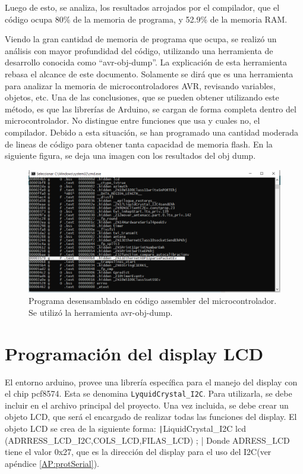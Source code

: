 Luego de esto, se analiza, los resultados arrojados por el compilador, que el código ocupa 80\% de la memoria de programa, y 52.9\% de la memoria RAM. 

Viendo la gran cantidad de memoria de programa que ocupa, se realizó un análisis con mayor profundidad del código, utilizando una herramienta de desarrollo conocida como ``avr-obj-dump''. La explicación de esta herramienta rebasa el alcance de este documento. Solamente se dirá que es una herramienta para analizar la memoria de microcontroladores AVR, revisando variables, objetos, etc. Una de las conclusiones, que se pueden obtener utilizando este método, es que las librerías de Arduino, se cargan de forma completa dentro del microcontrolador. No distingue entre funciones que usa y cuales no, el compilador. Debido a esta situación, se han programado una cantidad moderada de lineas de código para obtener tanta capacidad de memoria flash. En la siguiente figura, se deja una imagen con los resultados del obj dump.  

\begin{figure}[ht]
	\includegraphics{dump_memory}
	\caption{Programa desensamblado en código assembler del microcontrolador. Se utilizó la herramienta avr-obj-dump. }
\end{figure}

\section{Programación del display LCD} 

El entorno arduino, provee una librería específica para el manejo del display con el chip pcf8574. Esta se denomina \texttt{LyquidCrystal\_I2C}. Para utilizarla, se debe incluir en el archivo principal del proyecto. Una vez incluida, se debe crear un objeto LCD, que será el encargado de realizar todas las funciones del display. El objeto LCD se crea de la siguiente forma: 
\texttt|LiquidCrystal_I2C lcd (ADRRESS\_LCD_I2C,COLS\_LCD,FILAS\_LCD) ; |
Donde ADRESS\_LCD tiene el valor 0x27, que es la dirección del display para el uso del I2C(ver apéndice \ref{AP:protSerial}). 

